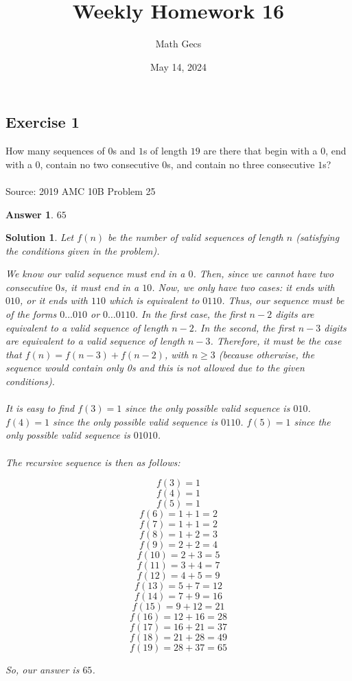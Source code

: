 \documentclass[12pt]{article}
\title{Weekly Homework 16}
\author{Math Gecs}
\date{May 14, 2024}
\newtheorem*{answer*}{Answer}
\newtheorem*{solution*}{Solution}
\begin{document}
\maketitle

\subsection*{Exercise 1}
How many sequences of $0$s and $1$s of length $19$ are there that begin with a $0$, end with a $0$, contain no two consecutive $0$s, and contain no three consecutive $1$s?
\\\\
Source: 2019 AMC 10B Problem 25

\begin{answer*}
$\boxed{65}$
\end{answer*}

\begin{solution*}
Let $f(n)$ be the number of valid sequences of length $n$ (satisfying the conditions given in the problem).

We know our valid sequence must end in a $0$. Then, since we cannot have two consecutive $0$s, it must end in a $10$. Now, we only have two cases: it ends with $010$, or it ends with $110$ which is equivalent to $0110$. Thus, our sequence must be of the forms $0\ldots010$ or $0\ldots0110$. In the first case, the first $n-2$ digits are equivalent to a valid sequence of length $n-2$. In the second, the first $n-3$ digits are equivalent to a valid sequence of length $n-3$. Therefore, it must be the case that $f(n) = f(n-3) + f(n-2)$, with $n \ge 3$ (because otherwise, the sequence would contain only 0s and this is not allowed due to the given conditions).
\\ \\
It is easy to find $f(3) = 1$ since the only possible valid sequence is $010$. $f(4)=1$ since the only possible valid sequence is $0110$. $f(5)=1$ since the only possible valid sequence is $01010$.
\\ \\
The recursive sequence is then as follows:

\[f(3)=1\]\[f(4)=1\]\[f(5) = 1\]\[f(6) = 1 + 1 = 2\]\[f(7) = 1 + 1 = 2\]\[f(8) = 1 + 2 = 3\]\[f(9) = 2 + 2 = 4\]\[f(10) = 2 + 3 = 5\]\[f(11) = 3 + 4 = 7\]\[f(12) = 4 + 5 = 9\]\[f(13) = 5 + 7 = 12\]\[f(14) = 7 + 9 = 16\]\[f(15) = 9 + 12 = 21\]\[f(16) = 12 + 16 = 28\]\[f(17) = 16 + 21 = 37\]\[f(18) = 21 + 28 = 49\]\[f(19) = 28 + 37 = 65\]

So, our answer is $\boxed{65}$.
\end{solution*}
\end{document}
